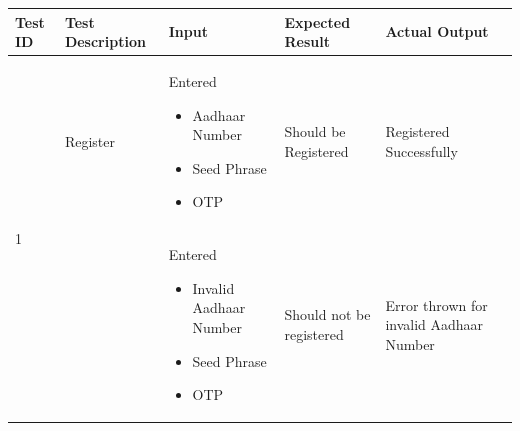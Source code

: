\begin{table}[h!]
	\begin{tabular}{|p{.65cm}|p{2.5cm}|p{3.5cm}|p{3cm}|p{3.5cm}|}
		\hline
		\centering\textbf{Test ID} & \centering\textbf{Test Description} & \centering\textbf{Input} & \centering\textbf{Expected Result} & \textbf{Actual Output} \\ \hline
 
		\multirow{2}{1em}{\scriptsize 1} & {\scriptsize   Register }& \scriptsize Entered \begin{itemize}
		  \vspace{-5mm}
		    \item Aadhaar Number
		    \vspace{-5mm}
		    \item Seed Phrase
		    \vspace{-5mm}
		    \item OTP
		\end{itemize}
		\vspace{-2mm} & \scriptsize  Should be Registered  & \scriptsize Registered Successfully  \\
		& & \scriptsize  \vspace{-5mm}	Entered
		\begin{itemize}
		  \vspace{-5mm}
		    \item Invalid Aadhaar Number
		    \vspace{-5mm} \hspace{3pt}
		    \item Seed Phrase
		    \vspace{-5mm}
		    \item OTP
		\end{itemize} & \scriptsize Should not be registered & \scriptsize Error thrown for invalid Aadhaar Number \\ \hline


\end{tabular}
\end{table}
